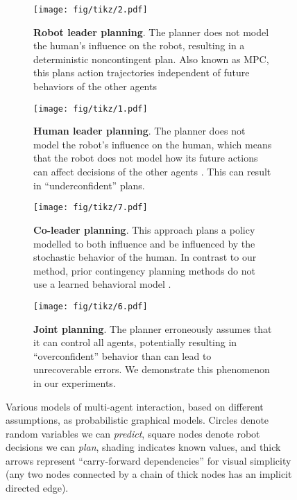 \documentclass[conference]{IEEEtran}
\begin{document}
\begin{figure*}[ht]
    \centering
    \begin{subfigure}[t]{\graphsubfiglen}
    \centering
        \texttt{[image: fig/tikz/2.pdf]}
        \caption{\textbf{Robot leader planning}. The planner does not model the human's influence on the robot, resulting in a deterministic noncontingent plan. Also known as MPC, this plans {action trajectories} independent of future behaviors of the other agents \citep{sadigh2016planning,schmerling2018multimodal,tang2019mfp}}
        \label{fig:level2}
    \end{subfigure}
    \hfill
    \begin{subfigure}[t]{\graphsubfiglen}
    \centering
        \texttt{[image: fig/tikz/1.pdf]}
        \caption{\textbf{Human leader planning}. The planner does not model the robot's influence on the human, which means that the robot does not model how its future actions can affect decisions of the other agents \citep{hardy2013contingency,zhan2016non}. This can result in ``underconfident'' plans.}
        \label{fig:level1}
    \end{subfigure}
    \hfill
    \begin{subfigure}[t]{\graphsubfiglen}
        \centering
        \texttt{[image: fig/tikz/7.pdf]}
        \caption{\textbf{Co-leader planning}. This approach plans a policy modelled to both influence and be influenced by the stochastic behavior of the human. In contrast to our method, prior contingency planning methods do not use a learned behavioral model \citep{galceran2017multipolicy,fisac2019hierarchical}.}
        \label{fig:zplanning}
    \end{subfigure}
    \hfill
         \begin{subfigure}[t]{\graphsubfiglen}
         \centering
        \texttt{[image: fig/tikz/6.pdf]}
        \caption{\textbf{Joint planning}. The planner erroneously assumes that it can control all agents, potentially resulting in ``overconfident'' behavior than can lead to unrecoverable errors. We demonstrate this phenomenon in our experiments.}
        \label{fig:overconfidentplanning}
        \vspace{-10pt}
    \end{subfigure}
    \caption{\small Various models of multi-agent interaction, based on different assumptions, as probabilistic graphical models. Circles denote random variables we can \textit{predict}, square nodes denote robot decisions we can \textit{plan}, shading indicates known values, and thick arrows represent ``carry-forward dependencies'' for visual simplicity (any two nodes connected by a chain of thick nodes has an implicit directed edge).
    }
    \vspace{-1.5em}
    \label{fig:models} 
\end{figure*}
\end{document}
